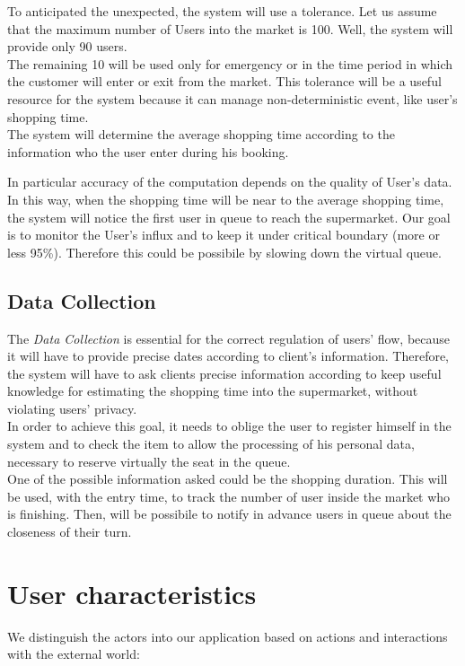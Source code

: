 To anticipated the unexpected, the system will use a tolerance.
Let us assume that the maximum number of Users into the market is 100. Well, the system will provide only 90 users.
\\
The remaining 10 will be used only for emergency or in the time period in which the customer will enter or exit from the market.
This tolerance will be a useful resource for the system because it can manage non-deterministic event, like user's shopping time.
\\%
The system will determine the average shopping time according to the information who the user enter during his booking.
\par
In particular accuracy of the computation depends on the quality of User's data.
In this way, when the shopping time will be near to the average shopping time, the system will notice the first user in queue to reach the supermarket.  
Our goal is to monitor the User's influx and to keep it under critical boundary (more or less 95\%). Therefore this could be possibile by slowing down the virtual queue.
\par
\subsection{Data Collection}
The \textit{Data Collection} is essential for the correct regulation of users' flow, because it will have to provide precise dates according to client’s information. 
Therefore, the system will have to ask clients precise information according to keep useful knowledge for estimating the shopping time into the supermarket, without violating users’ privacy. 
\\
In order to achieve this goal, it needs to oblige the user to register himself in the system and to check the item to allow the processing of his personal data, necessary to reserve virtually the seat in the queue.
\\
One of the possible information asked could be the shopping duration. This will be used, with the entry time, to track the number of user inside the market who is finishing. Then, will be possibile to notify in advance users in queue about the closeness of their turn.

\section{User characteristics}
We distinguish the actors into our application based on actions and interactions with the external world:

